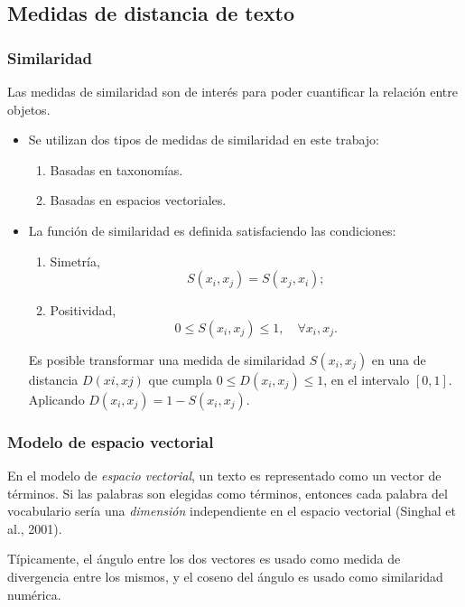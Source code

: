 \subsection{Medidas de distancia de texto}
\begin{frame}
	\frametitle{Similaridad}
	Las medidas de similaridad son de interés para poder cuantificar la relación entre objetos.
	\bigskip
	\begin{itemize}
		\item Se utilizan dos tipos de medidas de similaridad en este trabajo:
		\begin{enumerate}[<*>]
			\item Basadas en taxonomías.
			\item Basadas en espacios vectoriales.
		\end{enumerate}

		\bigskip
		\item
		La función de similaridad es definida satisfaciendo las condiciones:
		\begin{enumerate}[<*>]
			\item Simetría,
			\[S(x_i,x_j)=S(x_j,x_i);\]

			\item Positividad,
			\[0 \leq S(x_i,x_j) \leq 1, \quad \forall x_i,x_j.\]
		\end{enumerate}
		\medskip
		Es posible transformar una medida de similaridad \(S(x_i,x_j)\) en una de distancia \(D(xi,xj)\) que cumpla \(0 \leq D(x_i,x_j) \leq 1\), en el intervalo \([0,1]\). Aplicando \(D(x_i,x_j) = 1 - S(x_i,x_j)\).
	\end{itemize}
\end{frame}

\begin{frame}
	\frametitle{Modelo de espacio vectorial}
	En el modelo de \textit{espacio vectorial}, un texto es representado como un vector de términos. Si las palabras son elegidas como términos, entonces cada palabra del vocabulario sería una \textit{dimensión} independiente en el espacio vectorial (Singhal et al., 2001).

	\bigskip

	Típicamente, el ángulo entre los dos vectores es usado como medida de divergencia entre los mismos, y el coseno del ángulo es usado como similaridad numérica.
\end{frame}

